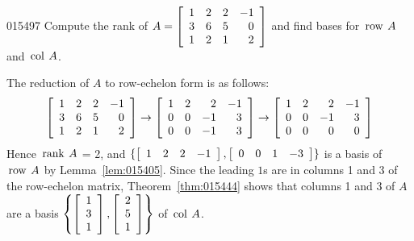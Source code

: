 {{\begin{example}{}{015497}
Compute the rank of 
$A = \left[ \begin{array}{rrrr}
1 & 2 & 2 & -1 \\
3 & 6 & 5 & 0 \\
1 & 2 & 1 & 2
\end{array} \right]$ and find bases for $\thinspace\operatorname{row\medspace} A$ and $\thinspace\operatorname{col\medspace} A$.

\begin{solution}
  The reduction of $A$ to row-echelon form is as follows:
\begin{equation*}
\left[ \begin{array}{rrrr}
1 & 2 & 2 & -1 \\
3 & 6 & 5 & 0 \\
1 & 2 & 1 & 2
\end{array} \right]
\rightarrow
\left[ \begin{array}{rrrr}
1 & 2 & 2 & -1 \\
0 & 0 & -1 & 3 \\
0 & 0 & -1 & 3
\end{array} \right]
\rightarrow
\left[ \begin{array}{rrrr}
1 & 2 & 2 & -1 \\
0 & 0 & -1 & 3 \\
0 & 0 & 0 & 0
\end{array} \right]
\end{equation*}
Hence $\thinspace\operatorname{rank\medspace} A$ = 2, and $ \{
\left[ \begin{array}{cccc}
1 & 2 & 2 & -1
\end{array} \right], 
\left[ \begin{array}{cccc}
0 & 0 & 1 & -3
\end{array} \right] \}$
is a basis of $\thinspace\operatorname{row\medspace} A$ by Lemma~\ref{lem:015405}. Since the leading $1$s are in columns 1 and 3 of the row-echelon matrix, Theorem~\ref{thm:015444} shows that columns 1 and 3 of $A$ are a basis
$\left\{
\left[ \begin{array}{r}
1\\
3\\
1
\end{array} \right], \left[ \begin{array}{r}
2\\
5\\
1
\end{array} \right]
\right\}$ of $\thinspace\operatorname{col\medspace} A$.
\end{solution}
\end{example}

}}
